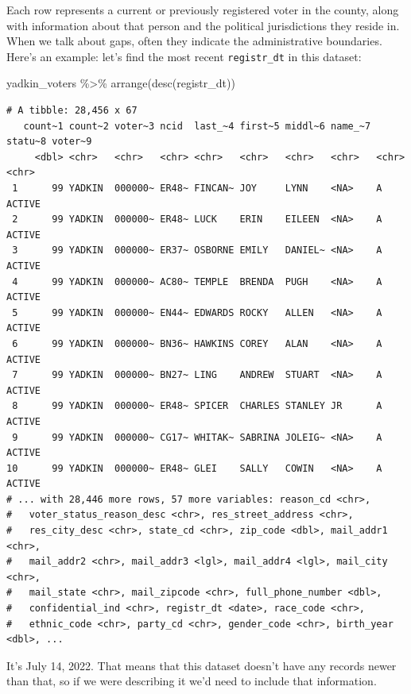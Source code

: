 \documentclass[
  letterpaper,
  DIV=11,
  numbers=noendperiod]{scrreprt}
\newenvironment{Shaded}{\begin{snugshade}}{\end{snugshade}}
\newcommand{\FunctionTok}[1]{\textcolor[rgb]{0.28,0.35,0.67}{#1}}
\newcommand{\NormalTok}[1]{\textcolor[rgb]{0.00,0.23,0.31}{#1}}
\newcommand{\SpecialCharTok}[1]{\textcolor[rgb]{0.37,0.37,0.37}{#1}}
\begin{document}
Each row represents a current or previously registered voter in the
county, along with information about that person and the political
jurisdictions they reside in. When we talk about gaps, often they
indicate the administrative boundaries. Here's an example: let's find
the most recent \texttt{registr\_dt} in this dataset:

\begin{Shaded}
\begin{Highlighting}[]
\NormalTok{yadkin\_voters }\SpecialCharTok{\%\textgreater{}\%} \FunctionTok{arrange}\NormalTok{(}\FunctionTok{desc}\NormalTok{(registr\_dt))}
\end{Highlighting}
\end{Shaded}

\begin{verbatim}
# A tibble: 28,456 x 67
   count~1 count~2 voter~3 ncid  last_~4 first~5 middl~6 name_~7 statu~8 voter~9
     <dbl> <chr>   <chr>   <chr> <chr>   <chr>   <chr>   <chr>   <chr>   <chr>  
 1      99 YADKIN  000000~ ER48~ FINCAN~ JOY     LYNN    <NA>    A       ACTIVE 
 2      99 YADKIN  000000~ ER48~ LUCK    ERIN    EILEEN  <NA>    A       ACTIVE 
 3      99 YADKIN  000000~ ER37~ OSBORNE EMILY   DANIEL~ <NA>    A       ACTIVE 
 4      99 YADKIN  000000~ AC80~ TEMPLE  BRENDA  PUGH    <NA>    A       ACTIVE 
 5      99 YADKIN  000000~ EN44~ EDWARDS ROCKY   ALLEN   <NA>    A       ACTIVE 
 6      99 YADKIN  000000~ BN36~ HAWKINS COREY   ALAN    <NA>    A       ACTIVE 
 7      99 YADKIN  000000~ BN27~ LING    ANDREW  STUART  <NA>    A       ACTIVE 
 8      99 YADKIN  000000~ ER48~ SPICER  CHARLES STANLEY JR      A       ACTIVE 
 9      99 YADKIN  000000~ CG17~ WHITAK~ SABRINA JOLEIG~ <NA>    A       ACTIVE 
10      99 YADKIN  000000~ ER48~ GLEI    SALLY   COWIN   <NA>    A       ACTIVE 
# ... with 28,446 more rows, 57 more variables: reason_cd <chr>,
#   voter_status_reason_desc <chr>, res_street_address <chr>,
#   res_city_desc <chr>, state_cd <chr>, zip_code <dbl>, mail_addr1 <chr>,
#   mail_addr2 <chr>, mail_addr3 <lgl>, mail_addr4 <lgl>, mail_city <chr>,
#   mail_state <chr>, mail_zipcode <chr>, full_phone_number <dbl>,
#   confidential_ind <chr>, registr_dt <date>, race_code <chr>,
#   ethnic_code <chr>, party_cd <chr>, gender_code <chr>, birth_year <dbl>, ...
\end{verbatim}

It's July 14, 2022. That means that this dataset doesn't have any
records newer than that, so if we were describing it we'd need to
include that information.
\end{document}
